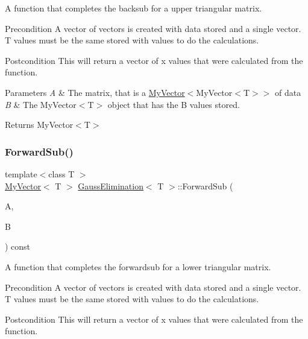 A function that completes the backsub for a upper triangular matrix. 

\begin{DoxyPrecond}{Precondition}
A vector of vectors is created with data stored and a single vector. T values must be the same stored with values to do the calculations. 
\end{DoxyPrecond}
\begin{DoxyPostcond}{Postcondition}
This will return a vector of x values that were calculated from the function.
\end{DoxyPostcond}

\begin{DoxyParams}{Parameters}
{\em A} & The matrix, that is a \mbox{\hyperlink{class_my_vector}{My\+Vector}}$<$My\+Vector$<$\+T$>$$>$ of data \\
\hline
{\em B} & The My\+Vector$<$\+T$>$ object that has the B values stored. \\
\hline
\end{DoxyParams}
\begin{DoxyReturn}{Returns}
My\+Vector$<$\+T$>$ 
\end{DoxyReturn}
\mbox{\label{class_gauss_elimination_aa7462be41101f990e6bc1ae8e8ed2958}} 
\subsubsection{\texorpdfstring{ForwardSub()}{ForwardSub()}}
{\footnotesize\ttfamily template$<$class T $>$ \\
\mbox{\hyperlink{class_my_vector}{My\+Vector}}$<$ T $>$ \mbox{\hyperlink{class_gauss_elimination}{Gauss\+Elimination}}$<$ T $>$\+::Forward\+Sub (\begin{DoxyParamCaption}\item[{const \mbox{\hyperlink{class_matrix}{Matrix}}$<$ T $>$ \&}]{A,  }\item[{const \mbox{\hyperlink{class_my_vector}{My\+Vector}}$<$ T $>$ \&}]{B }\end{DoxyParamCaption}) const}



A function that completes the forwardsub for a lower triangular matrix. 

\begin{DoxyPrecond}{Precondition}
A vector of vectors is created with data stored and a single vector. T values must be the same stored with values to do the calculations. 
\end{DoxyPrecond}
\begin{DoxyPostcond}{Postcondition}
This will return a vector of x values that were calculated from the function.
\end{DoxyPostcond}

